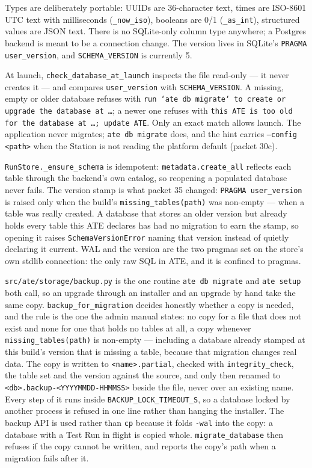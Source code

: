Types are deliberately portable: UUIDs are 36-character text, times are ISO-8601 UTC text with
milliseconds (\texttt{\_now\_iso}), booleans are 0/1 (\texttt{\_as\_int}), structured values are JSON
text. There is no SQLite-only column type anywhere; a Postgres backend is meant to be a connection
change. The version lives in SQLite's \texttt{PRAGMA user\_version}, and \texttt{SCHEMA\_VERSION} is
currently 5.

At launch, \texttt{check\_\allowbreak{}database\_\allowbreak{}at\_\allowbreak{}launch} inspects the file read-only --- it never creates it ---
and compares \texttt{user\_version} with \texttt{SCHEMA\_VERSION}. A missing, empty or older database
refuses with \texttt{run `ate db migrate` to create or upgrade the database at \dots}; a newer one refuses
with \texttt{this ATE is too old for the database at \dots; update ATE}. Only an exact match allows
launch. The application never migrates; \texttt{ate db migrate} does, and the hint carries
\texttt{--config <path>} when the Station is not reading the platform default (packet 30c).

\texttt{RunStore.\_\allowbreak{}ensure\_\allowbreak{}schema} is idempotent: \texttt{metadata.create\_all} reflects each table through
the backend's own catalog, so reopening a populated database never fails. The version stamp is what
packet 35 changed: \texttt{PRAGMA user\_version} is raised only when the build's
\texttt{missing\_tables(path)} was non-empty --- when a table was really created. A database that stores
an older version but already holds every table this ATE declares has had no migration to earn the stamp,
so opening it raises \texttt{SchemaVersionError} naming that version instead of quietly declaring it
current. WAL and the version are the two pragmas set on the store's own stdlib connection: the only raw
SQL in ATE, and it is confined to pragmas.

\texttt{src/ate/storage/backup.py} is the one routine \texttt{ate db migrate} and \texttt{ate setup}
both call, so an upgrade through an installer and an upgrade by hand take the same copy.
\texttt{backup\_for\_migration} decides honestly whether a copy is needed, and the rule is the one the
admin manual states: no copy for a file that does not exist and none for one that holds no tables at
all, a copy whenever \texttt{missing\_tables(path)} is non-empty --- including a database already
stamped at this build's version that is missing a table, because that migration changes real data.
The copy is written to \texttt{<name>.partial}, checked with \texttt{integrity\_check}, the table set and
the version against the source, and only then renamed to \texttt{<db>.backup-<YYYYMMDD-HHMMSS>} beside
the file, never over an existing name. Every step of it runs inside \texttt{BACKUP\_LOCK\_TIMEOUT\_S},
so a database locked by another process is refused in one line rather than hanging the installer. The
backup API is used rather than \texttt{cp} because it folds \texttt{-wal} into the
copy: a database with a Test Run in flight is copied whole. \texttt{migrate\_database} then refuses if
the copy cannot be written, and reports the copy's path when a migration fails after it.

